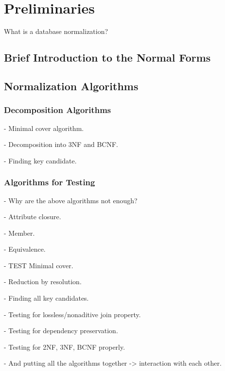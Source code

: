 \chapter{Preliminaries}
\label{chap:preliminaries}
What is a database normalization?
\section{Brief Introduction to the Normal Forms}
\label{sec:nfintro}
\section{Normalization Algorithms}
\label{sec:alg}
\subsection{Decomposition Algorithms}

- Minimal cover algorithm.

- Decomposition into 3NF and BCNF.

- Finding key candidate.

\subsection{Algorithms for Testing}

- Why are the above algorithms not enough?

- Attribute closure.

- Member.

- Equivalence.

- TEST Minimal cover.

- Reduction by resolution.

- Finding all key candidates.

- Testing for lossless/nonaditive join property.

- Testing for dependency preservation. 

- Testing for 2NF, 3NF, BCNF properly.

- And putting all the algorithms together -> interaction with each other.
